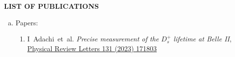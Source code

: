 \documentclass[12pt]{article}
\begin{document}
\pagebreak
\vspace{0.4cm}
\colorbox{gray!40}{\begin{minipage}{17.5cm}
    \bf {LIST OF PUBLICATIONS} 
\end{minipage} }
\begin{enumerate}[a.]
\item Papers:
  \begin{enumerate}[1.]
  \item I~Adachi~et~al. \emph{Precise measurement of the $D_s^+$ lifetime at Belle II}, \href{https://doi.org/10.1103/PhysRevLett.131.171803}{Physical Review Letters 131 (2023) 171803}

\end{enumerate}
\end{enumerate}
\end{document}

